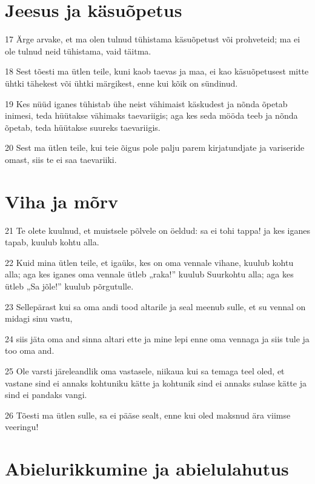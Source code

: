\section*{Jeesus ja käsuõpetus}

\par 17 Ärge arvake, et ma olen tulnud tühistama käsuõpetust või prohveteid; ma ei ole tulnud neid tühistama, vaid täitma.
\par 18 Sest tõesti ma ütlen teile, kuni kaob taevas ja maa, ei kao käsuõpetusest mitte ühtki tähekest või ühtki märgikest, enne kui kõik on sündinud.
\par 19 Kes nüüd iganes tühistab ühe neist vähimaist käskudest ja nõnda õpetab inimesi, teda hüütakse vähimaks taevariigis; aga kes seda mööda teeb ja nõnda õpetab, teda hüütakse suureks taevariigis.
\par 20 Sest ma ütlen teile, kui teie õigus pole palju parem kirjatundjate ja variseride omast, siis te ei saa taevariiki.

\section*{Viha ja mõrv}

\par 21 Te olete kuulnud, et muistsele põlvele on öeldud: sa ei tohi tappa! ja kes iganes tapab, kuulub kohtu alla.
\par 22 Kuid mina ütlen teile, et igaüks, kes on oma vennale vihane, kuulub kohtu alla; aga kes iganes oma vennale ütleb „raka!” kuulub Suurkohtu alla; aga kes ütleb „Sa jõle!” kuulub põrgutulle.
\par 23 Sellepärast kui sa oma andi tood altarile ja seal meenub sulle, et su vennal on midagi sinu vastu,
\par 24 siis jäta oma and sinna altari ette ja mine lepi enne oma vennaga ja siis tule ja too oma and.
\par 25 Ole varsti järeleandlik oma vastasele, niikaua kui sa temaga teel oled, et vastane sind ei annaks kohtuniku kätte ja kohtunik sind ei annaks sulase kätte ja sind ei pandaks vangi.
\par 26 Tõesti ma ütlen sulle, sa ei pääse sealt, enne kui oled maksnud ära viimse veeringu!

\section*{Abielurikkumine ja abielulahutus}

